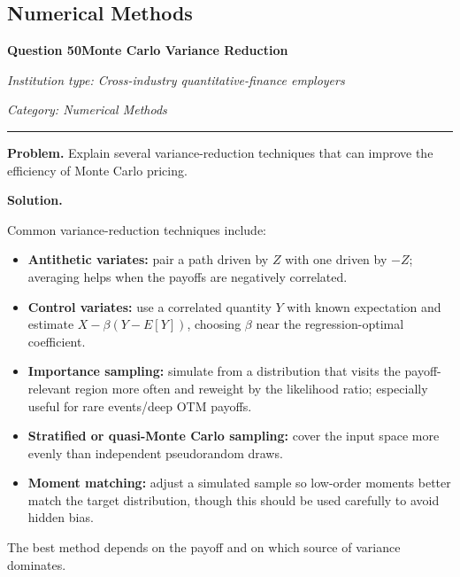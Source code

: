\documentclass[11pt,letterpaper,openany]{book}
\newcommand{\FoundationQuestionHeader}[3]{%
  \vspace{1.0em}%
  {\large\bfseries #1\enspace #2\par}%
  {\small\itshape Institution type: Cross-industry quantitative-finance employers\par}%
  {\small\itshape Category: #3\par}%
  \vspace{0.25em}\hrule\vspace{0.45em}%
}
\begin{document}
\subsection{Numerical Methods}

\FoundationQuestionHeader{Question 50}{Monte Carlo Variance Reduction}{Numerical Methods}

\textbf{Problem.} Explain several variance-reduction techniques that can improve the efficiency of Monte Carlo pricing.


\textbf{Solution.}

Common variance-reduction techniques include:
\begin{itemize}
\item \textbf{Antithetic variates:} pair a path driven by \(Z\) with one driven by \(-Z\); averaging helps when the payoffs are negatively correlated.
\item \textbf{Control variates:} use a correlated quantity \(Y\) with known expectation and estimate \(X-\beta(Y-E[Y])\), choosing \(\beta\) near the regression-optimal coefficient.
\item \textbf{Importance sampling:} simulate from a distribution that visits the payoff-relevant region more often and reweight by the likelihood ratio; especially useful for rare events/deep OTM payoffs.
\item \textbf{Stratified or quasi-Monte Carlo sampling:} cover the input space more evenly than independent pseudorandom draws.
\item \textbf{Moment matching:} adjust a simulated sample so low-order moments better match the target distribution, though this should be used carefully to avoid hidden bias.
\end{itemize}
The best method depends on the payoff and on which source of variance dominates.
\end{document}

